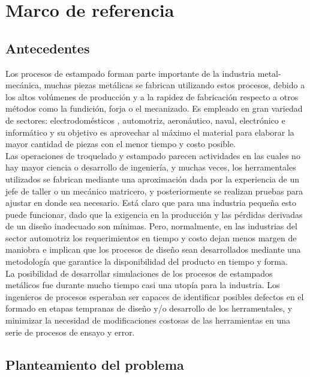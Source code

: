 \chapter{Marco de referencia}

\section{Antecedentes}

Los procesos de estampado forman  parte importante de la industria metal-mecánica, muchas 
piezas metálicas se fabrican utilizando estos procesos, debido a los altos volúmenes de 
producción y a la rapidez de fabricación respecto a otros métodos como la fundición, forja 
o el mecanizado. Es empleado en gran variedad de sectores: electrodomésticos ,
automotriz, aeronáutico, naval, electrónico e informático y su objetivo es aprovechar al máximo 
el material para elaborar la mayor cantidad de piezas con el menor tiempo y costo posible. \\

Las operaciones de troquelado y estampado parecen actividades en las cuales no hay mayor 
ciencia o desarrollo de ingeniería, y muchas veces, los herramentales utilizados 
se fabrican mediante una aproximación dada por la experiencia de un jefe de taller o un 
mecánico matricero, y posteriormente se realizan pruebas para ajustar en donde sea necesario. 
Está claro que para una industria pequeña esto puede funcionar, dado que la exigencia 
en la producción y las pérdidas derivadas de un diseño inadecuado son mínimas. Pero, normalmente,  
en las industrias del sector automotriz los requerimientos en tiempo y costo dejan menos margen 
de maniobra e implican que los procesos de diseño sean desarrollados mediante una metodología 
que garantice la disponibilidad del producto en tiempo y forma.\\


La posibilidad de desarrollar simulaciones de los procesos de estampados metálicos fue 
durante mucho tiempo casi una utopía para la industria. Los ingenieros 
de procesos esperaban ser capaces de identificar posibles defectos en el formado en etapas 
tempranas de diseño y/o desarrollo de los herramentales, y minimizar la necesidad de 
modificaciones costosas de las herramientas en una serie de procesos de ensayo y error.\\


\section{Planteamiento del problema}

